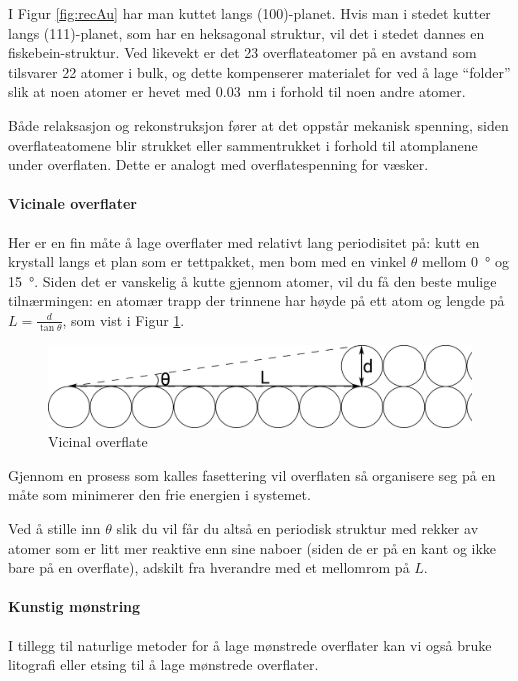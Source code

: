 I Figur \ref{fig:recAu} har man kuttet langs (100)-planet. Hvis man i stedet kutter langs (111)-planet, som har en heksagonal struktur, vil det i stedet dannes en fiskebein-struktur. Ved likevekt er det 23 overflateatomer på en avstand som tilsvarer 22 atomer i bulk, og dette kompenserer materialet for ved å lage ``folder'' slik at noen atomer er hevet med \SI{0.03}{\nano\meter} i forhold til noen andre atomer.

Både relaksasjon og rekonstruksjon fører at det oppstår mekanisk spenning, siden overflateatomene blir strukket eller sammentrukket i forhold til atomplanene under overflaten. Dette er analogt med overflatespenning for væsker. %

\paragraph{Vicinale overflater} Her er en fin måte å lage overflater med relativt lang periodisitet på: kutt en krystall langs et plan som er tettpakket, men bom med en vinkel $\theta$ mellom \SI{0}{\degree} og \SI{15}{\degree}. Siden det er vanskelig å kutte gjennom atomer, vil du få den beste mulige tilnærmingen: en atomær trapp der trinnene har høyde på ett atom og lengde på $L = \frac{d}{\tan\theta}$, som vist i Figur \ref{fig:vicinal}. 
\begin{figure}[H]
	\bmd\centering
	\includegraphics[width=\linewidth]{vicinal.png}
	\caption{Vicinal overflate}
	\label{fig:vicinal}
\emd\end{figure}
Gjennom en prosess som kalles fasettering vil overflaten så organisere seg på en måte som minimerer den frie energien i systemet.

Ved å stille inn $\theta$ slik du vil får du altså en periodisk struktur med rekker av atomer som er litt mer reaktive enn sine naboer (siden de er på en kant og ikke bare på en overflate), adskilt fra hverandre med et mellomrom på $L$.

\paragraph{Kunstig mønstring} I tillegg til naturlige metoder for å lage mønstrede overflater kan vi også bruke litografi eller etsing til å lage mønstrede overflater.


